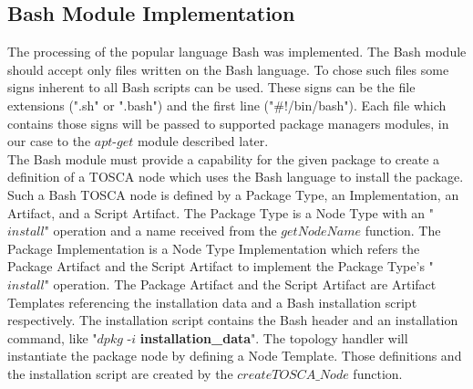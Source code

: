 \subsection*{Bash Module Implementation}
The processing of the popular language Bash was implemented. 
The Bash module should accept only files written on the Bash language.
To chose such files some signs inherent to all Bash scripts can be used. 
These signs can be the file extensions (".sh" or ".bash") and the first line ("\#!/bin/bash"). 
Each file which contains those signs will be passed to supported package managers modules, in our case to the $apt$-$get$ module described later. \\
The Bash module must provide a capability for the given package to create a definition of a TOSCA node which uses the Bash language to install the package.
Such a Bash TOSCA node is defined by a Package Type, an  Implementation, an  Artifact, and a Script Artifact.
The Package Type is a Node Type with an "$install$" operation and a name received from the $getNodeName$ function.
The Package Implementation is a Node Type Implementation which refers the Package Artifact and the Script Artifact to implement the Package Type's "$install$" operation.
The Package Artifact and the Script Artifact are Artifact Templates referencing the installation data and a Bash installation script respectively.
The installation script contains the Bash header and an installation command, like "$dpkg$ -$i$ \textbf{installation\_data}".
The topology handler will instantiate the package node by defining a Node Template.
Those definitions and the installation script are created by the $createTOSCA\_Node$ function.

